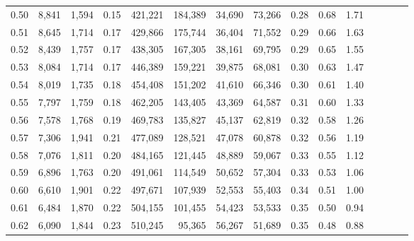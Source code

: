 \begin{tabular}{rrrcrrrrrrrrrrr}
0.50 &   8,841 &  1,594 &                                       0.15 &  421,221 &  184,389 &   34,690 &   73,266 &  0.28 &  0.68 &                         1.71 \\
0.51 &   8,645 &  1,714 &                                       0.17 &  429,866 &  175,744 &   36,404 &   71,552 &  0.29 &  0.66 &                         1.63 \\
0.52 &   8,439 &  1,757 &                                       0.17 &  438,305 &  167,305 &   38,161 &   69,795 &  0.29 &  0.65 &                         1.55 \\
0.53 &   8,084 &  1,714 &                                       0.17 &  446,389 &  159,221 &   39,875 &   68,081 &  0.30 &  0.63 &                         1.47 \\
0.54 &   8,019 &  1,735 &                                       0.18 &  454,408 &  151,202 &   41,610 &   66,346 &  0.30 &  0.61 &                         1.40 \\
0.55 &   7,797 &  1,759 &                                       0.18 &  462,205 &  143,405 &   43,369 &   64,587 &  0.31 &  0.60 &                         1.33 \\
0.56 &   7,578 &  1,768 &                                       0.19 &  469,783 &  135,827 &   45,137 &   62,819 &  0.32 &  0.58 &                         1.26 \\
0.57 &   7,306 &  1,941 &                                       0.21 &  477,089 &  128,521 &   47,078 &   60,878 &  0.32 &  0.56 &                         1.19 \\
0.58 &   7,076 &  1,811 &                                       0.20 &  484,165 &  121,445 &   48,889 &   59,067 &  0.33 &  0.55 &                         1.12 \\
0.59 &   6,896 &  1,763 &                                       0.20 &  491,061 &  114,549 &   50,652 &   57,304 &  0.33 &  0.53 &                         1.06 \\
0.60 &   6,610 &  1,901 &                                       0.22 &  497,671 &  107,939 &   52,553 &   55,403 &  0.34 &  0.51 &                         1.00 \\
0.61 &   6,484 &  1,870 &                                       0.22 &  504,155 &  101,455 &   54,423 &   53,533 &  0.35 &  0.50 &                         0.94 \\
0.62 &   6,090 &  1,844 &                                       0.23 &  510,245 &   95,365 &   56,267 &   51,689 &  0.35 &  0.48 &                         0.88 \\

\end{tabular}
